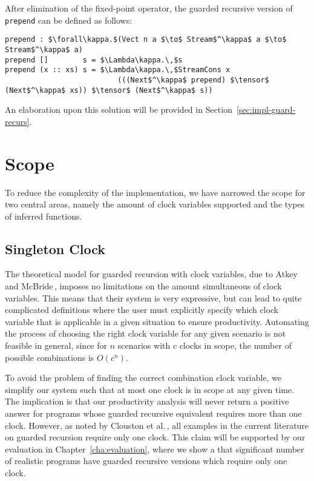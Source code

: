 After elimination of the fixed-point operator, the guarded recursive version of
\texttt{prepend} can be defined as follows:

\begin{lstlisting}[mathescape]
prepend : $\forall\kappa.$(Vect n a $\to$ Stream$^\kappa$ a $\to$ Stream$^\kappa$ a)
prepend []        s = $\Lambda\kappa.\,$s
prepend (x :: xs) s = $\Lambda\kappa.\,$StreamCons x 
                          (((Next$^\kappa$ prepend) $\tensor$ (Next$^\kappa$ xs)) $\tensor$ (Next$^\kappa$ s))
\end{lstlisting}

An elaboration upon this solution will be provided in Section~\ref{sec:impl-guard-recurs}.

\section{Scope}
To reduce the complexity of the implementation, we have narrowed the scope for
two central areas, namely the amount of clock variables supported and the types
of inferred functions.

\subsection{Singleton Clock}
\label{sec:singleton-clock}

The theoretical model for guarded recursion with clock variables, due to Atkey
and McBride\,\citep{Atkey:2013}, imposes no limitations on the amount
simultaneous of clock variables. This means that their system is very
expressive, but can lead to quite complicated definitions where the user must
explicitly specify which clock variable that is applicable in a given situation to ensure
productivity. Automating the process of choosing the right clock variable for
any given scenario is not feasible in general, since for $n$ scenarios with $c$
clocks in scope, the number of possible combinations is $O(c^n)$.

To avoid the problem of finding the correct combination clock variable, we
simplify our system such that at most one clock is in scope at any given
time. The implication is that our productivity analysis will never return a
positive answer for programs whose guarded recursive equivalent requires more
than one clock. However, as noted by Clouston et
al.\,\citep{BirkedalL:guarded-lambda-conf}, all examples in the current literature
on guarded recursion require only one clock. This claim will be supported by our
evaluation in Chapter~\ref{cha:evaluation}, where we show a that significant number of
realistic programs have guarded recursive versions which require only one clock.

